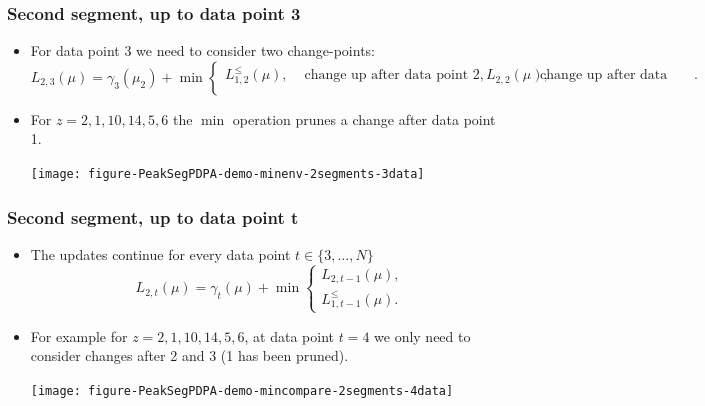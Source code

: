 \documentclass{beamer}
\begin{document}
\begin{frame}
  \frametitle{Second segment, up to data point 3}
  \begin{itemize}
  \item For data point 3 we need to consider two change-points:
    \begin{equation*}
      L_{2,3}(\mu) =  \gamma_3(\mu_2) + \min
      \begin{cases}
        L_{1,2}^{\leq}(\mu), & \text{ change up after data point 2},
        L_{2,2}(\mu), & \text{ change up after data point 1}. \\
      \end{cases}
    \end{equation*}
  \item For $z = 2, 1, 10, 14, 5, 6$ the $\min$ operation prunes a
    change after data point 1.
    \begin{center}
      \texttt{[image: figure-PeakSegPDPA-demo-minenv-2segments-3data]}
    \end{center}
  \end{itemize}
\end{frame}

\begin{frame}
  \frametitle{Second segment, up to data point t}
  \begin{itemize}
  \item The updates continue for every data point $t\in\{3, ..., N\}$
    \begin{equation*}
      L_{2,t}(\mu) =  \gamma_t(\mu) + \min
      \begin{cases}
        L_{2,t-1}(\mu),\\
        L_{1,t-1}^{\leq}(\mu).
      \end{cases}
    \end{equation*}
  \item For example for $z = 2, 1, 10, 14, 5, 6$, at data point $t=4$
    we only need to consider changes after 2 and 3 (1 has been
    pruned).
    \begin{center}
      \texttt{[image: figure-PeakSegPDPA-demo-mincompare-2segments-4data]}
    \end{center}
  \end{itemize}
\end{frame}
\end{document}

